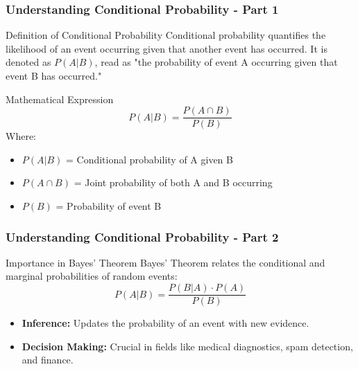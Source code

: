 \documentclass[aspectratio=169]{beamer}
\begin{document}
\begin{frame}[fragile]
    \frametitle{Understanding Conditional Probability - Part 1}
    \begin{block}{Definition of Conditional Probability}
        Conditional probability quantifies the likelihood of an event occurring given that another event has occurred. It is denoted as \( P(A | B) \), read as "the probability of event A occurring given that event B has occurred."
    \end{block}

    \begin{block}{Mathematical Expression}
        \begin{equation}
        P(A | B) = \frac{P(A \cap B)}{P(B)}
        \end{equation}
        Where:
        \begin{itemize}
            \item \( P(A | B) \) = Conditional probability of A given B
            \item \( P(A \cap B) \) = Joint probability of both A and B occurring
            \item \( P(B) \) = Probability of event B
        \end{itemize}
    \end{block}
\end{frame}

\begin{frame}[fragile]
    \frametitle{Understanding Conditional Probability - Part 2}
    \begin{block}{Importance in Bayes’ Theorem}
        Bayes' Theorem relates the conditional and marginal probabilities of random events:
        \begin{equation}
        P(A | B) = \frac{P(B | A) \cdot P(A)}{P(B)}
        \end{equation}
    \end{block}

    \begin{itemize}
        \item \textbf{Inference:} Updates the probability of an event with new evidence.
        \item \textbf{Decision Making:} Crucial in fields like medical diagnostics, spam detection, and finance.
    \end{itemize}
\end{frame}
\end{document}
